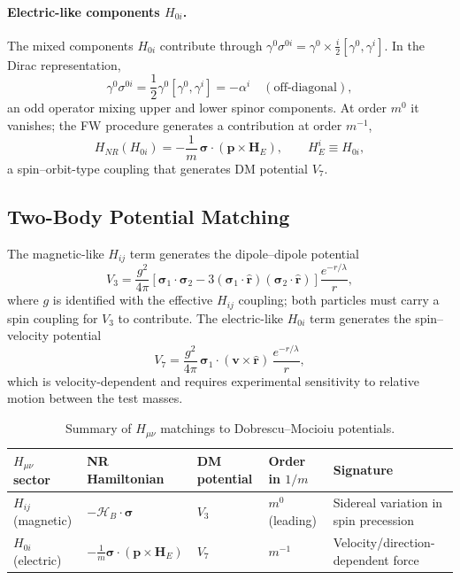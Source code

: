 \documentclass[main]{subfiles}
\begin{document}
\paragraph{Electric-like components $H_{0i}$.} The mixed components $H_{0i}$
contribute through $\gamma^0\sigma^{0i}=\gamma^0\times\tfrac{i}{2}[\gamma^0,\gamma^i]$.
In the Dirac representation,
\begin{equation}
  \gamma^0\sigma^{0i} = \frac12\gamma^0[\gamma^0,\gamma^i] = -\alpha^i
  \quad (\text{off-diagonal}),
\end{equation}
an odd operator mixing upper and lower spinor components. At order $m^0$ it
vanishes; the FW procedure generates a contribution at order $m^{-1}$,
\begin{equation}
  H_{NR}(H_{0i}) = -\frac1m\,\boldsymbol\sigma\cdot(\mathbf p\times\mathbf H_E),
  \qquad H_E^i \equiv H_{0i},
\end{equation}
a spin--orbit-type coupling that generates DM potential $V_7$.

\subsection{Two-Body Potential Matching}

The magnetic-like $H_{ij}$ term generates the dipole--dipole potential
\begin{equation}
  V_3 = \frac{g^2}{4\pi}\left[\boldsymbol\sigma_1\cdot\boldsymbol\sigma_2
  - 3(\boldsymbol\sigma_1\cdot\hat{\mathbf r})(\boldsymbol\sigma_2\cdot\hat{\mathbf r})\right]
  \frac{e^{-r/\lambda}}{r},
\end{equation}
where $g$ is identified with the effective $H_{ij}$ coupling; both particles
must carry a spin coupling for $V_3$ to contribute. The electric-like
$H_{0i}$ term generates the spin--velocity potential
\begin{equation}
  V_7 = \frac{g^2}{4\pi}\,\boldsymbol\sigma_1\cdot(\mathbf v\times\hat{\mathbf r})\,
  \frac{e^{-r/\lambda}}{r},
\end{equation}
which is velocity-dependent and requires experimental sensitivity to
relative motion between the test masses.

\begin{table}[h]
\centering
\begin{tabular}{@{}l l l l >{\raggedright\arraybackslash}p{3cm}@{}}
\toprule
$H_{\mu\nu}$ sector & NR Hamiltonian & DM potential & Order in $1/m$ & Signature \\
\midrule
$H_{ij}$ (magnetic) & $-\boldsymbol{\mathcal H}_B\cdot\boldsymbol\sigma$ & $V_3$ & $m^0$ (leading) & Sidereal variation in spin precession \\
$H_{0i}$ (electric) & $-\tfrac1m\boldsymbol\sigma\cdot(\mathbf p\times\mathbf H_E)$ & $V_7$ & $m^{-1}$ & Velocity/direction-dependent force \\
\bottomrule
\end{tabular}
\caption{Summary of $H_{\mu\nu}$ matchings to Dobrescu--Mocioiu potentials.}
\end{table}
\end{document}
